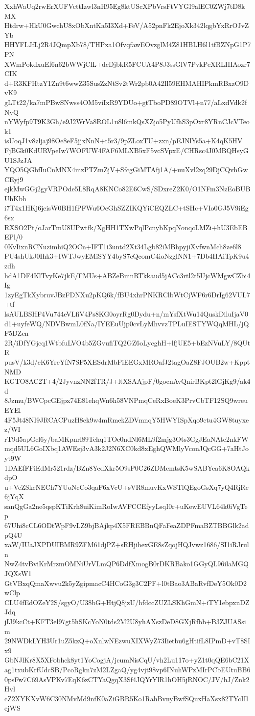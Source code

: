 XxhWaUq2rwErXUFVcttIzwl3nH95Eg8ktUScXPbVrsFtVYGI9alEC0ZWj7tD8kMX
Htdrw+HkU0GwchU8xObXntKa5I3Xd+FeV/A52pnFk2EjoXk342lqgbYxRrOJvZYb
HHYFLJfLj2R4JQmpXb78/THPxa1OfvqfawEOvzglM4Z81HBLH6l1tfBZNpG1P7PN
XWmPokdxuEf6n62bWWjClL+dcDjbkR5FCUA4P8J3ssGlV7PvkPeXRLHIAozr7CIK
d+R3KFHtzY1Zn9t6wwZ35SusZzNtSv2tWr2pb0A42Il59EHMAHIPkmRBxzO9DvK9
gLTt22/ka7mPBwSNwss4OM5viIxR9YDUo+gtTboPD89OTVl+n77/aLxdVdk2fNyQ
nYWyfp9T9K3Gh/e9J2WrVa8ROL1u8l6mkQsXZjo5PyUfhS3pOxr8YRnCJcVTeok1
isUoqJ1v8zljaj98Oe8eF5jjxNnN+t5r3/9pZLoxTU+zxn/pEJNlYs5a+K4qK5HV
FjBGk0KdURVpeIw7WOFUW4FAF6MLXB5xF5vcSVpxE/CHRsc4J0MBQHsyGU1SJzJA
YQO5QGbfIuCnMNX4mzPTZmZjV+SfcgGiMTAfj1A/+uuXvl2zq29DjCQvhGwCEyj9
ejkMwGGj2gyVRPOde5L8RqA8KNCo82E6CwS/SDxreZ2K0/O1NFm3NzEoBUBUhKbh
i7T4x1HKj6jeisW0BH1fPFWu6OeGhSZZIKQYiCEQZLC+tSHc+VIo0GJ5V9iEg6sx
RXSO2Pt/oJarTmU8UPwtfk/XgHH1TXwPqlPcnybKpqNonqcLMZi+hU3EbEBEPl/0
0KvIixnRCNuzimhiQ2OCn+IFT1i3untd2Xt34Lgb82iMBhpyjiXvfwnMch8ze6l8
PU4shUkJ0Ihk3+IWTJwyEMiSYY4byS7cQcomC4ioNzglNN1+7Db4HAiTpK9u4zdh
hdA1DF4KlTvyKe7jkE/FMUs+ABZeBmnRTkkaud5jACc3rtl2t5UjcWMgwCZbi4Ig
1zyEgTkXybruvJBzFDNXu2pKQ6k/fBU4xhrPNKRClbWtCjWF6r6DrIg62VUL7+tf
lsAULBSHF4Vu744eVLfiV4Ps8KG0oyrRg0Dydu+n/mYsfXtWu14QuskDiluIjaV0
d1+uyfeWQ/NDVBwmL0fNa/IYEEuUjp0cvLyMhvvzTPLuIESTYWQqMHL/jQF5DZcn
2R/iDfYGjcq1WtbfuLVO4b5ZGvufiTQ2GZ6oLycghH+lfjUE5+bEzNVuLY/8QUtR
pusV/k3d/eK6YreYfN7SF5XESdrMbPiEEGxMROafJ2tagOaZ8FJOUB2w+KpptNMD
KGTO8AC2T+4/2JyvnzNN2fTR/J+ltXSAAjpF/0goenAvQnirBKpt2lGjKg9/ak4d
8Jzmu/BWCpcGEjpx74E81ehqWn6h58VNPmqCeRxBoeK3PrvCbTF12SQ9wreuEYEl
4F5Jt48NI9JRCACPuzH8ek9w4mRmekZDVmnqY5HWYISpXqo9ctu4GW8tuyxez/WI
rT9d5apGcl6y/baMKpnrl89Tchq1TOc0ndNl6ML9f2mjg3Ots3GgJEaNAte2nkFW
mqd5UL6GoIXbq1AWEsj3vA3k2J2N6XC0kd8xEghQWMlyVconJQcGG+7aHtJoyt9W
1DAEfFFiEdMr521rdz/BZn8YedXkr5O9sP0C26ZDMcmtsK5wSABYca6K8OAQkdpO
u+VeZSkcNECh7YUoNcCo3qaF6xVcU+sVR8muvKxWSTlQEgoGsXq7yQ4RjRe6jYqX
sanQgGa2ne5qspKTiKrh8uiKimRoIwAVFCCEfyyLsqI0r+uKewEUVL64k0iVgTep
67Uhi8cCL6ODtWpF9vLZ9bjBAjkp4X5FREBBnQFaFeaZDPFmaBZTBBGlk2adpQ4U
xaW/IUaJXPDUIBMR9ZFM61djPZ+sRHjihexGE8sZqojHQJvwz1686/SI1iRJruln
NwZ4tvBviKrMrzmOMNiUrVLmQP6DdfXmogB0rDKRBako1GGyQL96ilaMGQJQXsW1
GtVBxqQmaXwvu2k5yZgipmacC4HCoG3g3C2PF+l0tBao3ABaRvfDeY5Ok0D2wClp
CLU4fEdOZeY2S/sgyO/U38bG+HtjQ8jzU/hfdccZUZLSKhGmN+iTY1ebpxnDZJdq
jIJ9kcCt+KFT3el97gt5hSKcYoN0tds2M2U8yhAXszDeD8GXjRfbb+B3ZJUASsim
29NWDkLYH3Ur1uZ5kzQ+oXnlwNEzwuXIXWyZ73Iietbu6gHtifL8IPmD+vT8SIx9
GbNJlKr8X5XFobhck8yt1YoCogjA/jcumNisCqU/vh2Lu117o+yZ1t0qQE6bC21X
ag1txubKrfUdcSB/PcoRgkn7zM2LZgaQ/yg4vjt98vp6INuhWPzMIrPCbEUtuBB6
0psFw7C69AsVPKv7EqK6zCTYaQgqX3Sf4JQYrYlR1hOH5jRNOC/JV/hJ/Znk2Hvl
cZ2XYKXvW6C30NMvMd9nfK0aZiGBR5Ko1RahBvnyBwfSQuxHaXsx82TYcIIlejWS
